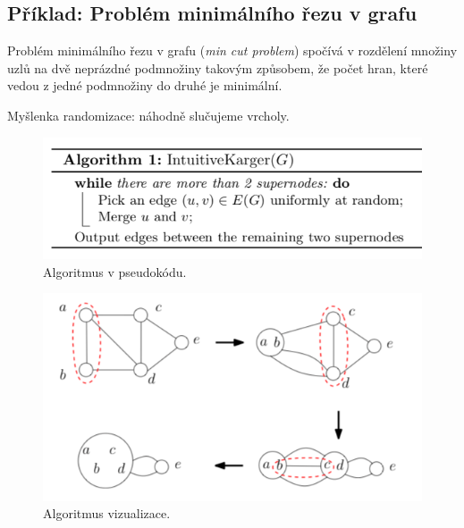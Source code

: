 \subsection{Příklad: Problém minimálního řezu v grafu}

\begin{compactitem}
    \item Problém minimálního řezu v grafu (\textit{min cut problem}) spočívá v rozdělení množiny uzlů na dvě neprázdné podmnožiny takovým způsobem, že počet hran, které vedou z jedné podmnožiny do druhé je minimální.

    \item Myšlenka randomizace: náhodně slučujeme vrcholy.
\end{compactitem}

\begin{figure}[H]
    \centering
    \includegraphics[width=0.75\linewidth]{min_cut_alg.png}
    \caption{Algoritmus v pseudokódu.}
\end{figure}

\begin{figure}[H]
    \centering
    \includegraphics[width=0.75\linewidth]{min_cut_visualizaiton.png}
    \caption{Algoritmus vizualizace.}
\end{figure}

